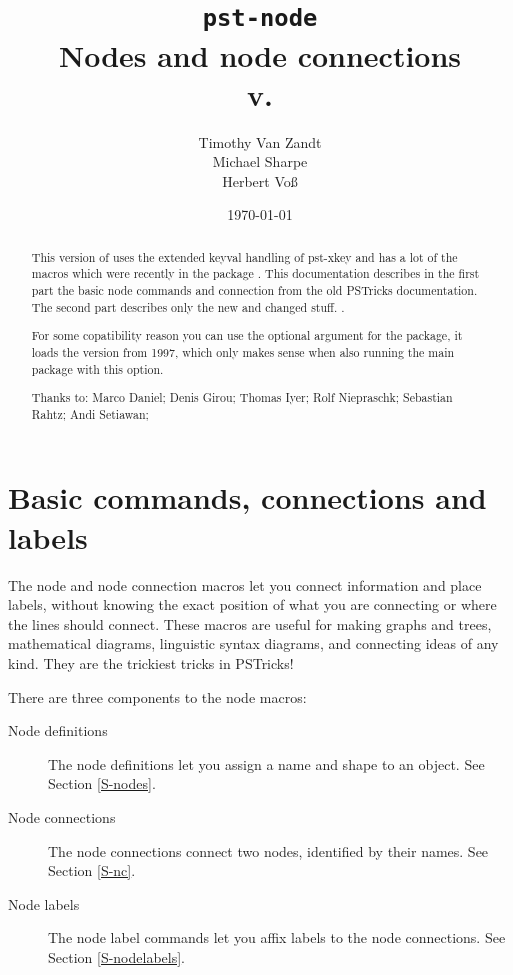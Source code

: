\documentclass[fontsize=11pt,english,BCOR=10mm,DIV=12,bibliography=totoc,parskip=false,headings=small,
    headinclude=false,footinclude=false,oneside]{pst-doc}
\let\pstFV\fileversion
\begin{document}
\title{\texttt{pst-node}\\Nodes and node connections%
\\\small v.\pstFV}
\author{Timothy Van Zandt\\Michael Sharpe\\Herbert Vo\ss}
\date{\today}

\settitle

\begin{abstract}
This version of  uses the extended keyval handling
of pst-xkey and has a lot of the macros which were recently in
the package . This documentation describes in the first part
the basic node commands and connection from the old PSTricks documentation.
The second part describes only the
new and changed stuff. .

For some copatibility reason you can use the optional argument 
for the package, it loads the version from 1997, which only makes sense
when also running the main package  with this option.

\vfill
\noindent
Thanks to:  Marco Daniel; Denis Girou; Thomas Iyer; Rolf Niepraschk; Sebastian Rahtz; Andi Setiawan;
\end{abstract}

\clearpage
\tableofcontents

\clearpage
\part{Basic commands, connections and labels}

\leavevmode
{}%

The node and node connection macros let you connect information and place
labels, without knowing the exact position of what you are connecting or where
the lines should connect. These macros are useful for making graphs and trees,
mathematical diagrams, linguistic syntax diagrams, and connecting ideas of any
kind. They are the trickiest tricks in PSTricks!

There are three components to the node macros:
\begin{description}
  \item[Node definitions] The node definitions let you assign a name and shape
  to an object. See Section \ref{S-nodes}.
  \item[Node connections] The node connections connect two nodes, identified
  by their names. See Section \ref{S-nc}.
  \item[Node labels] The node label commands let you affix labels to the node
  connections. See Section \ref{S-nodelabels}.
\end{description}
\end{document}
